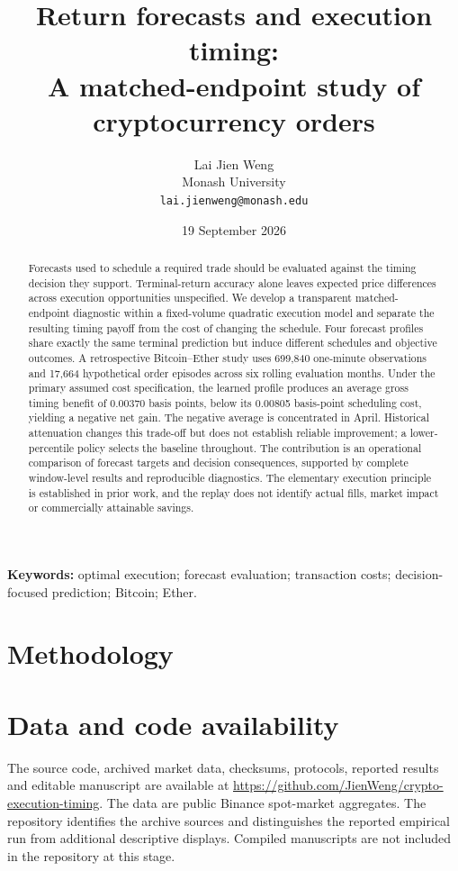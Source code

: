 \documentclass[11pt]{article}
\title{Return forecasts and execution timing:\\A matched-endpoint study of cryptocurrency orders}
\author{Lai Jien Weng\\Monash University\\\texttt{lai.jienweng@monash.edu}}
\date{19 September 2026}
\begin{document}
\maketitle
\begin{abstract}
Forecasts used to schedule a required trade should be evaluated against the timing decision they support. Terminal-return accuracy alone leaves expected price differences across execution opportunities unspecified. We develop a transparent matched-endpoint diagnostic within a fixed-volume quadratic execution model and separate the resulting timing payoff from the cost of changing the schedule. Four forecast profiles share exactly the same terminal prediction but induce different schedules and objective outcomes. A retrospective Bitcoin--Ether study uses 699,840 one-minute observations and 17,664 hypothetical order episodes across six rolling evaluation months. Under the primary assumed cost specification, the learned profile produces an average gross timing benefit of 0.00370 basis points, below its 0.00805 basis-point scheduling cost, yielding a negative net gain. The negative average is concentrated in April. Historical attenuation changes this trade-off but does not establish reliable improvement; a lower-percentile policy selects the baseline throughout. The contribution is an operational comparison of forecast targets and decision consequences, supported by complete window-level results and reproducible diagnostics. The elementary execution principle is established in prior work, and the replay does not identify actual fills, market impact or commercially attainable savings.
\end{abstract}
\noindent\textbf{Keywords:} optimal execution; forecast evaluation; transaction costs; decision-focused prediction; Bitcoin; Ether.



\section{Methodology}\label{sec:methods}


\FloatBarrier

\FloatBarrier


\section*{Data and code availability}
{\raggedright The source code, archived market data, checksums, protocols, reported results and editable manuscript are available at \url{https://github.com/JienWeng/crypto-execution-timing}. The data are public Binance spot-market aggregates. The repository identifies the archive sources and distinguishes the reported empirical run from additional descriptive displays. Compiled manuscripts are not included in the repository at this stage.\par}
\end{document}
